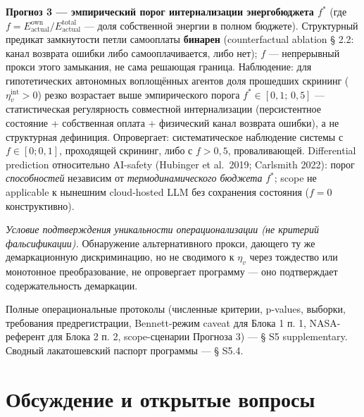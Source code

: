 \documentclass[pdflatex,sn-mathphys-ay]{sn-jnl}
\begin{document}
\begin{enumerate}
  \textbf{Прогноз 3 --- эмпирический порог интернализации энергобюджета \(f^*\)} (где \(f = E_{\text{actual}}^{\text{own}}/E_{\text{actual}}^{\text{total}}\) --- доля собственной энергии в полном бюджете). Структурный предикат замкнутости петли самооплаты \textbf{бинарен} (counterfactual ablation § 2.2: канал возврата ошибки либо самооплачивается, либо нет); \(f\) --- непрерывный прокси этого замыкания, не сама решающая граница. Наблюдение: для гипотетических автономных воплощённых агентов доля прошедших скрининг (\(\eta_v^{\text{int}} > 0\)) резко возрастает выше эмпирического порога \(f^* \in [0{,}1;\, 0{,}5]\) --- статистическая регулярность совместной интернализации (персистентное состояние + собственная оплата + физический канал возврата ошибки), а не структурная дефиниция. Опровергает: систематическое наблюдение системы с \(f \in [0; 0{,}1]\), проходящей скрининг, либо с \(f > 0{,}5\), проваливающей. Differential prediction относительно AI-safety (Hubinger et al.~2019; Carlsmith 2022): порог \emph{способностей} независим от \emph{термодинамического бюджета} \(f^*\); scope не applicable к нынешним cloud-hosted LLM без сохранения состояния (\(f = 0\) конструктивно).
\end{enumerate}

\emph{Условие подтверждения уникальности операционализации (не критерий фальсификации).} Обнаружение альтернативного прокси, дающего ту же демаркационную дискриминацию, но не сводимого к \(\eta_v\) через тождество или монотонное преобразование, не опровергает программу --- оно подтверждает содержательность демаркации.

Полные операциональные протоколы (численные критерии, p-values, выборки, требования предрегистрации, Bennett-режим caveat для Блока 1 п. 1, NASA-референт для Блока 2 п. 2, scope-сценарии Прогноза 3) --- § S5 supplementary. Сводный лакатошевский паспорт программы --- § S5.4.

\section{Обсуждение и открытые вопросы}\label{ux43eux431ux441ux443ux436ux434ux435ux43dux438ux435-ux438-ux43eux442ux43aux440ux44bux442ux44bux435-ux432ux43eux43fux440ux43eux441ux44b}
\end{document}
